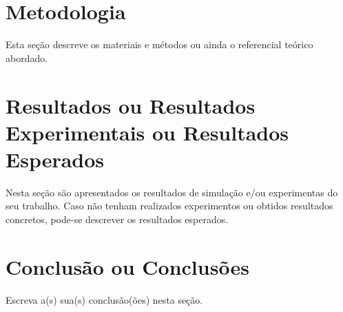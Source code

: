 \documentclass[journal]{IEEEtran}
\begin{document}








\section{Metodologia}
Esta seção descreve os materiais e métodos ou ainda o referencial teórico abordado.


\section{Resultados ou Resultados Experimentais ou Resultados Esperados}
Nesta seção são apresentados os resultados de simulação e/ou experimentas do seu trabalho. Caso não tenham realizados experimentos ou obtidos resultados concretos, pode-se descrever os resultados esperados.


\section{Conclusão ou Conclusões}
Escreva a(s) sua(s) conclusão(ões) nesta seção.

\end{document}
